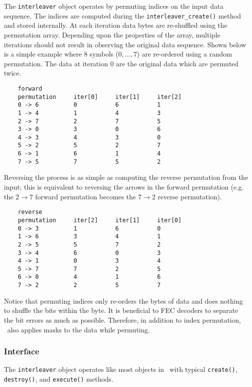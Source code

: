 The {\tt interleaver} object operates by permuting indices on the input data
sequence.
The indices are computed during the {\tt interleaver\_create()} method and
stored internally.
At each iteration data bytes are re-shuffled using the permutation array.
Depending upon the properties of the array, multiple iterations should not
result in observing the original data sequence.
Shown below is a simple example where 8 symbols ($0,\ldots,7$) are re-ordered
using a random permutation.
The data at iteration 0 are the original data which are permuted twice.
\begin{verbatim}
    forward
    permutation     iter[0]     iter[1]     iter[2]
    0 -> 6          0           6           1
    1 -> 4          1           4           3
    2 -> 7          2           7           5
    3 -> 0          3           0           6
    4 -> 3          4           3           0
    5 -> 2          5           2           7
    6 -> 1          6           1           4
    7 -> 5          7           5           2
\end{verbatim}
%
Reversing the process is as simple as computing the reverse permutation from
the input; this is equivalent to reversing the arrows in the forward
permutation
(e.g. the $2 \rightarrow 7$ forward permutation becomes the $7 \rightarrow 2$
reverse permutation).
\begin{verbatim}
    reverse
    permutation     iter[2]     iter[1]     iter[0]
    0 -> 3          1           6           0
    1 -> 6          3           4           1
    2 -> 5          5           7           2
    3 -> 4          6           0           3
    4 -> 1          0           3           4
    5 -> 7          7           2           5
    6 -> 0          4           1           6
    7 -> 2          2           5           7
\end{verbatim}
%
Notice that permuting indices only re-orders the bytes of data and does
nothing to shuffle the bits within the byte.
It is beneficial to FEC decoders to separate the bit errors as much as
possible.
Therefore, in addition to index permutation, \liquid\ also applies masks to
the data while permuting.

\subsubsection{Interface}
\label{module:framing:interleaver:interface}
The {\tt interleaver} object operates like most objects in \liquid\ with
typical {\tt create()}, {\tt destroy()}, and {\tt execute()} methods.

